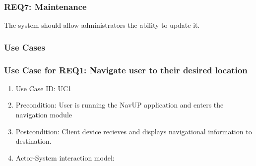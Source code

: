\documentclass[11pt,a4paper]{article}
\begin{document}
		\subsubsection{REQ7: Maintenance}
			The system should allow administrators the ability to update it.
			
	\subsubsection{Use Cases}
		\subsubsection {Use Case for REQ1: Navigate user to their desired location}
			\begin{enumerate}
			\renewcommand{\labelenumi}{{\textbf{\arabic{enumi}.}}}
			\item Use Case ID: UC1
			\item Precondition: User is running the NavUP application and enters the navigation module
			\item Postcondition: Client device recieves and displays navigational information to destination.
			\item Actor-System interaction model:
			\end{enumerate}
\end{document}
